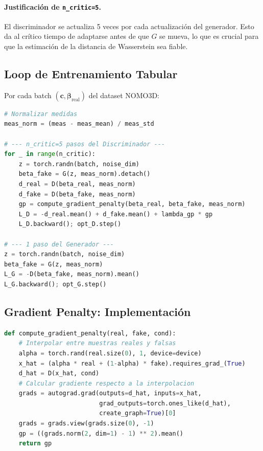 \documentclass[a4paper,11pt]{article}
\begin{document}
\paragraph{Justificación de \texttt{n\_critic=5}.}
El discriminador se actualiza 5 veces por cada actualización del generador.
Esto da al crítico tiempo de adaptarse antes de que $G$ se mueva, lo que
es crucial para que la estimación de la distancia de Wasserstein sea fiable.

\subsection{Loop de Entrenamiento Tabular}

Por cada batch $(\bm{c}, \bm{\beta}_{\text{real}})$ del dataset NOMO3D:

\begin{lstlisting}[language=Python, caption={Loop WGAN-GP tabular (extracto de train.py)}]
# Normalizar medidas
meas_norm = (meas - meas_mean) / meas_std

# --- n_critic=5 pasos del Discriminador ---
for _ in range(n_critic):
    z = torch.randn(batch, noise_dim)
    beta_fake = G(z, meas_norm).detach()
    d_real = D(beta_real, meas_norm)
    d_fake = D(beta_fake, meas_norm)
    gp = compute_gradient_penalty(beta_real, beta_fake, meas_norm)
    L_D = -d_real.mean() + d_fake.mean() + lambda_gp * gp
    L_D.backward(); opt_D.step()

# --- 1 paso del Generador ---
z = torch.randn(batch, noise_dim)
beta_fake = G(z, meas_norm)
L_G = -D(beta_fake, meas_norm).mean()
L_G.backward(); opt_G.step()
\end{lstlisting}

\subsection{Gradient Penalty: Implementación}

\begin{lstlisting}[language=Python, caption={compute\_gradient\_penalty (train.py)}]
def compute_gradient_penalty(real, fake, cond):
    # Interpolar entre muestras reales y falsas
    alpha = torch.rand(real.size(0), 1, device=device)
    x_hat = (alpha * real + (1-alpha) * fake).requires_grad_(True)
    d_hat = D(x_hat, cond)
    # Calcular gradiente respecto a la interpolacion
    grads = autograd.grad(outputs=d_hat, inputs=x_hat,
                          grad_outputs=torch.ones_like(d_hat),
                          create_graph=True)[0]
    grads = grads.view(grads.size(0), -1)
    gp = ((grads.norm(2, dim=1) - 1) ** 2).mean()
    return gp
\end{lstlisting}
\end{document}
